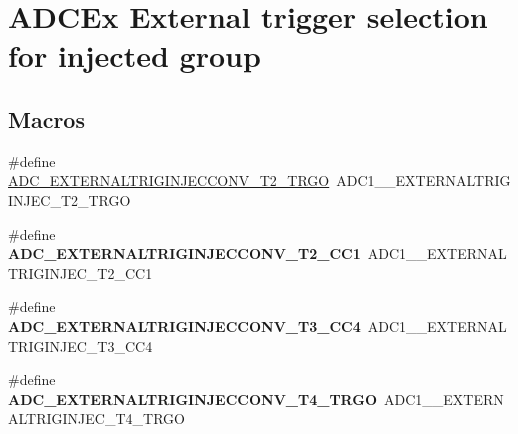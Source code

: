 \hypertarget{group___a_d_c_ex___external__trigger__source___injected}{}\section{A\+D\+C\+Ex External trigger selection for injected group}
\label{group___a_d_c_ex___external__trigger__source___injected}
\subsection*{Macros}
\begin{DoxyCompactItemize}
\item 
\#define \hyperlink{group___a_d_c_ex___external__trigger__source___injected_ga5408c05ebc9a0a16c08b0be0e79506dc}{A\+D\+C\+\_\+\+E\+X\+T\+E\+R\+N\+A\+L\+T\+R\+I\+G\+I\+N\+J\+E\+C\+C\+O\+N\+V\+\_\+\+T2\+\_\+\+T\+R\+GO}~A\+D\+C1\+\_\+\_\+\+E\+X\+T\+E\+R\+N\+A\+L\+T\+R\+I\+G\+I\+N\+J\+E\+C\+\_\+\+T2\+\_\+\+T\+R\+GO
\item 
\mbox{\label{group___a_d_c_ex___external__trigger__source___injected_gaadc7ecf196e883d7375e299dde80a8fa}} 
\#define {\bfseries A\+D\+C\+\_\+\+E\+X\+T\+E\+R\+N\+A\+L\+T\+R\+I\+G\+I\+N\+J\+E\+C\+C\+O\+N\+V\+\_\+\+T2\+\_\+\+C\+C1}~A\+D\+C1\+\_\+\_\+\+E\+X\+T\+E\+R\+N\+A\+L\+T\+R\+I\+G\+I\+N\+J\+E\+C\+\_\+\+T2\+\_\+\+C\+C1
\item 
\mbox{\label{group___a_d_c_ex___external__trigger__source___injected_ga826c3989c8fe4861729fdb966ff07c2d}} 
\#define {\bfseries A\+D\+C\+\_\+\+E\+X\+T\+E\+R\+N\+A\+L\+T\+R\+I\+G\+I\+N\+J\+E\+C\+C\+O\+N\+V\+\_\+\+T3\+\_\+\+C\+C4}~A\+D\+C1\+\_\+\_\+\+E\+X\+T\+E\+R\+N\+A\+L\+T\+R\+I\+G\+I\+N\+J\+E\+C\+\_\+\+T3\+\_\+\+C\+C4
\item 
\mbox{\label{group___a_d_c_ex___external__trigger__source___injected_ga87a5534698643b2c3872efb7d17d4f44}} 
\#define {\bfseries A\+D\+C\+\_\+\+E\+X\+T\+E\+R\+N\+A\+L\+T\+R\+I\+G\+I\+N\+J\+E\+C\+C\+O\+N\+V\+\_\+\+T4\+\_\+\+T\+R\+GO}~A\+D\+C1\+\_\+\_\+\+E\+X\+T\+E\+R\+N\+A\+L\+T\+R\+I\+G\+I\+N\+J\+E\+C\+\_\+\+T4\+\_\+\+T\+R\+GO
\item 
\mbox{\label{group___a_d_c_ex___external__trigger__source___injected_ga364de9670181999642dcd159f22815c8}} 

\end{DoxyCompactItemize}

